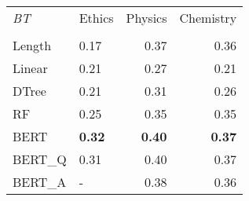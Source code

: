 \begin{tabular}{llrr}
\toprule
\textit{BT} & Ethics &  Physics &  Chemistry \\
				  &        &          &            \\
\midrule
Length &   		0.17 &     0.37 &       		0.36 \\
Linear &   		0.21 &     0.27 &       		0.21 \\
DTree  &  		0.21 &     0.31 &       		0.26 \\
RF     &   		0.25 &     0.35 &       		0.35 \\
BERT   &   \textbf{0.32} &     \textbf{0.40} &      \textbf{ 0.37} \\
BERT\_Q &   				0.31 &     0.40 &       0.37 \\
BERT\_A &      - 		&     0.38 &       0.36 \\
\bottomrule
\end{tabular}
